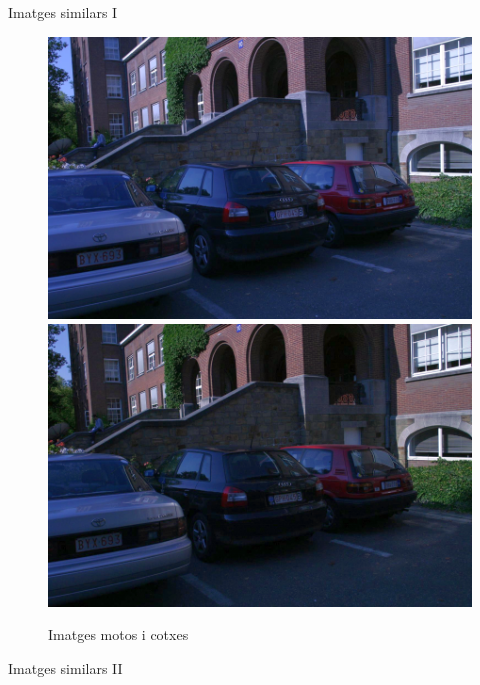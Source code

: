 \documentclass[xcolor=table, 11pt]{beamer}
\newcommand\tz{\fontsize{13}{15.6}\selectfont}
\begin{document}
\begin{frame}{Imatges similars I}
\begin{figure}[!htb]
				\includegraphics[width=\linewidth]{images/experiments/cars4}
			\endminipage
			\hspace*{0.2cm}
				\includegraphics[width=\linewidth]{images/experiments/cars6}
			\endminipage
			\caption{Imatges motos i cotxes}
		\end{figure}
	\end{frame}

	\begin{frame}{Imatges similars II}
		\tz
		\begin{table}[H]
			\begin{center}
			\end{center}
			\caption{\textit{Matching} - imatges similars}
		\end{table}
	\end{frame}
\end{document}
